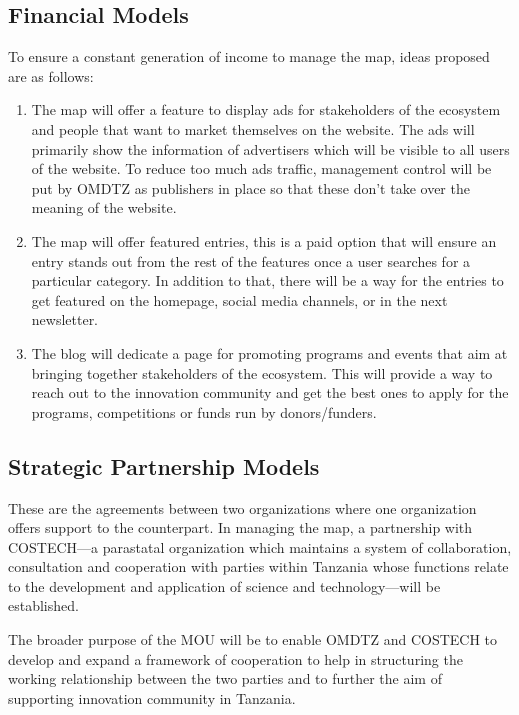 \documentclass[a4paper,12pt,twoside]{article}
\begin{document}
\subsection{Financial Models}
To ensure a constant generation of income to manage the map, ideas proposed are as follows:
\begin{enumerate}
    \item The map will offer a feature to display ads for  stakeholders of the ecosystem and people that want to market themselves on the website. The ads will primarily show the information of advertisers which will be visible to all users of the website. To reduce too much ads traffic, management control will be put by OMDTZ as publishers in place so that these don’t take over the meaning of the website. 
    \item The map will offer featured entries, this is a paid option that will ensure an entry stands out from the rest of the features once a user searches for a particular category. In addition to that, there will be a way for the entries to get featured on the homepage, social media channels, or in the next newsletter.
    \item The blog will dedicate a page for promoting programs and events that aim at bringing together stakeholders of the ecosystem. This will provide a way to reach out to the innovation community and get the best ones to apply for the programs, competitions or funds run by donors/funders.
\end{enumerate}

\subsection{Strategic Partnership Models}
These are the agreements between two organizations where one organization offers support to the counterpart. In managing the map, a partnership with COSTECH---a parastatal organization which maintains a system of collaboration, consultation and cooperation with parties within Tanzania whose functions relate to the development and application of science and technology---will be established.
\medskip

The broader purpose of the MOU will be to enable OMDTZ and COSTECH to develop and expand a framework of cooperation to help in structuring the working relationship between the two parties and to further the aim of supporting innovation community in Tanzania.
\end{document}
